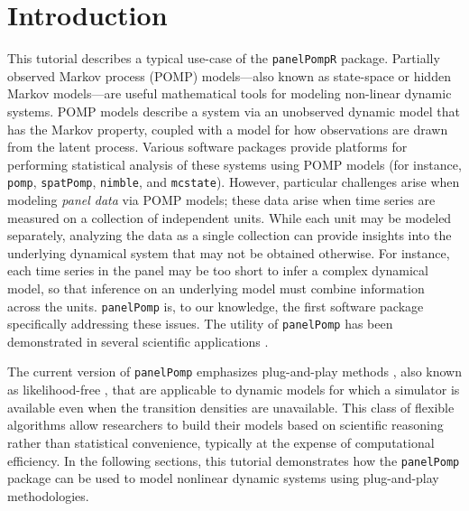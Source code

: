 \documentclass[12pt]{article}\usepackage[]{graphicx}\usepackage[table]{xcolor}
\newcommand\R{\texttt{R}\xspace}
\newcommand\panelPomp{\texttt{panelPomp}\xspace}
\newcommand\pomp{\texttt{pomp}\xspace}
\newcommand\nimble{\texttt{nimble}\xspace}
\newcommand\mcstate{\texttt{mcstate}\xspace}
\newcommand\spatPomp{\texttt{spatPomp}\xspace}
\begin{document}
\vfill




\newpage
{}


\section{Introduction}
\label{sec:intro}

This tutorial describes a typical use-case of the \panelPomp \R package.
Partially observed Markov process (POMP) models---also known as state-space or hidden Markov models---are useful mathematical tools for modeling non-linear dynamic systems.
POMP models describe a system via an unobserved dynamic model that has the Markov property, coupled with a model for how observations are drawn from the latent process.
Various software packages provide platforms for performing statistical analysis of these systems using POMP models (for instance, \pomp \citep{king16}, \spatPomp \citep{asfaw21}, \nimble \citep{michaud21}, and \mcstate \citep{fitzjohn20}).
However, particular challenges arise when modeling \emph{panel data} via POMP models; these data arise when time series are measured on a collection of independent units.
While each unit may be modeled separately, analyzing the data as a single collection can provide insights into the underlying dynamical system that may not be obtained otherwise.
For instance, each time series in the panel may be too short to infer a complex dynamical model, so that inference on an underlying model must combine information across the units.
\panelPomp is, to our knowledge, the first software package specifically addressing these issues.
The utility of \panelPomp has been demonstrated in several scientific applications \citep{ranjeva17,ranjeva19,wale19,domeyer22,lee20}.

The current version of \panelPomp emphasizes plug-and-play methods \citep{breto09,he10}, also known as likelihood-free \citep{marjoram03,sisson07}, that are applicable to dynamic models for which a simulator is available even when the transition densities are unavailable.
This class of flexible algorithms allow researchers to build their models based on scientific reasoning rather than statistical convenience, typically at the expense of computational efficiency.
In the following sections, this tutorial demonstrates how the \panelPomp package can be used to model nonlinear dynamic systems using plug-and-play methodologies.
\end{document}
